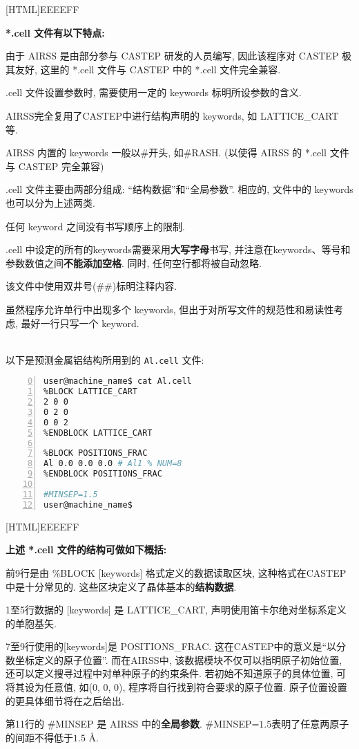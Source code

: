 \documentclass[a4paper, 10pt]{article}
\begin{document}
\noindent{}[HTML]{EEEEFF}{\parbox{\textwidth}{%
\noindent \textbf{*.cell 文件有以下特点:}
\begin{maineu}
\item 由于 AIRSS 是由部分参与 CASTEP 研发的人员编写, 因此该程序对 CASTEP 极其友好, 这里的 *.cell 文件与 CASTEP 中的 *.cell 文件完全兼容.
\item *.cell 文件设置参数时, 需要使用一定的 keywords 标明所设参数的含义.
\item AIRSS完全复用了CASTEP中进行结构声明的 keywords, 如 LATTICE\_CART 等.
\item AIRSS 内置的 keywords 一般以\#开头, 如\#RASH. (以使得 AIRSS 的 *.cell 文件与 CASTEP 完全兼容)
\item *.cell 文件主要由两部分组成: ``结构数据''和``全局参数''. 相应的, 文件中的 keywords 也可以分为上述两类.
\item 任何 keyword 之间没有书写顺序上的限制.
\item *.cell 中设定的所有的keywords需要采用\textbf{大写字母}书写, 并注意在keywords、等号和参数数值之间\textbf{不能添加空格}. 同时, 任何空行都将被自动忽略.
\item 该文件中使用双井号(\#\#)标明注释内容.
\item 虽然程序允许单行中出现多个 keywords, 但出于对所写文件的规范性和易读性考虑, 最好一行只写一个 keyword.
\end{maineu}}}\\

\vspace{4em}
以下是预测金属铝结构所用到的 \verb|Al.cell| 文件:
\begin{lstlisting}[language={bash},numbers=left,firstnumber=0]
user@machine_name$ cat Al.cell
%BLOCK LATTICE_CART
2 0 0
0 2 0
0 0 2 
%ENDBLOCK LATTICE_CART

%BLOCK POSITIONS_FRAC
Al 0.0 0.0 0.0 # Al1 % NUM=8
%ENDBLOCK POSITIONS_FRAC

#MINSEP=1.5
user@machine_name$
\end{lstlisting}


\noindent{}[HTML]{EEEEFF}{\parbox{\textwidth}{%
\noindent \textbf{上述 *.cell 文件的结构可做如下概括:}
\begin{maineu}
  \item 前9行是由 \%BLOCK [keywords] 格式定义的数据读取区块, 这种格式在CASTEP中是十分常见的. 这些区块定义了晶体基本的\textbf{结构数据}.   
  \item 1至5行数据的 [keywords] 是 LATTICE\_CART, 声明使用笛卡尔绝对坐标系定义的单胞基矢. 
  \item 7至9行使用的[keywords]是 POSITIONS\_FRAC. 这在CASTEP中的意义是``以分数坐标定义的原子位置''. 而在AIRSS中, 该数据模块不仅可以指明原子初始位置, 还可以定义搜寻过程中对单种原子的约束条件. 若初始不知道原子的具体位置, 可将其设为任意值, 如(0, 0, 0), 程序将自行找到符合要求的原子位置. 原子位置设置的更具体细节将在之后给出. 
  \item 第11行的 \#MINSEP 是 AIRSS 中的\textbf{全局参数}.
  \#MINSEP=\(1.5\)表明了任意两原子的间距不得低于\(1.5\) \r{A}.
\end{maineu}}}\\
\end{document}

